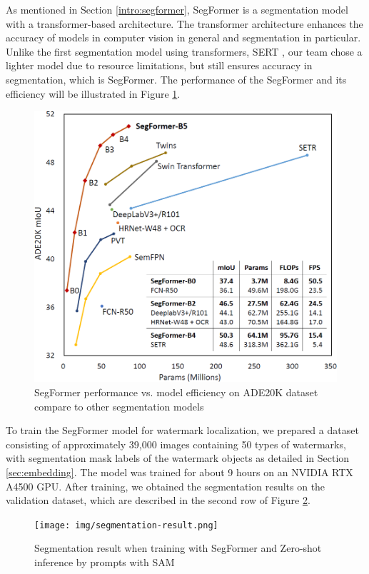 As mentioned in Section \ref{intro:segformer}, SegFormer \cite{xie2021segformer} is a segmentation model with a transformer-based architecture. The transformer architecture enhances the accuracy of models in computer vision in general and segmentation in particular. Unlike the first segmentation model using transformers, SERT \cite{zheng2021rethinking}, our team chose a lighter model due to resource limitations, but still ensures accuracy in segmentation, which is SegFormer. The performance of the SegFormer and its efficiency will be illustrated in Figure \ref{fig:SegFormer-chart-performance}.

\begin{figure}[t]
    \centering
    \includegraphics[width=0.5\linewidth]{img/segformer-performance.png}
    \caption[SegFormer and other model performance]{SegFormer performance vs. model efficiency on ADE20K dataset compare to other segmentation models \cite{xie2021segformer}}
    \label{fig:SegFormer-chart-performance}
\end{figure}

To train the SegFormer model for watermark localization, we prepared a dataset consisting of approximately 39,000 images containing 50 types of watermarks, with segmentation mask labels of the watermark objects as detailed in Section \ref{sec:embedding}. The model was trained for about 9 hours on an NVIDIA RTX A4500 GPU. After training, we obtained the segmentation results on the validation dataset, which are described in the second row of Figure \ref{fig:segmentation-result}.

\begin{figure}[t]
    \centering
    \texttt{[image: img/segmentation-result.png]}
    \caption[Segmentation result]{Segmentation result when training with SegFormer and Zero-shot inference by prompts with SAM}
    \label{fig:segmentation-result}
\end{figure}

